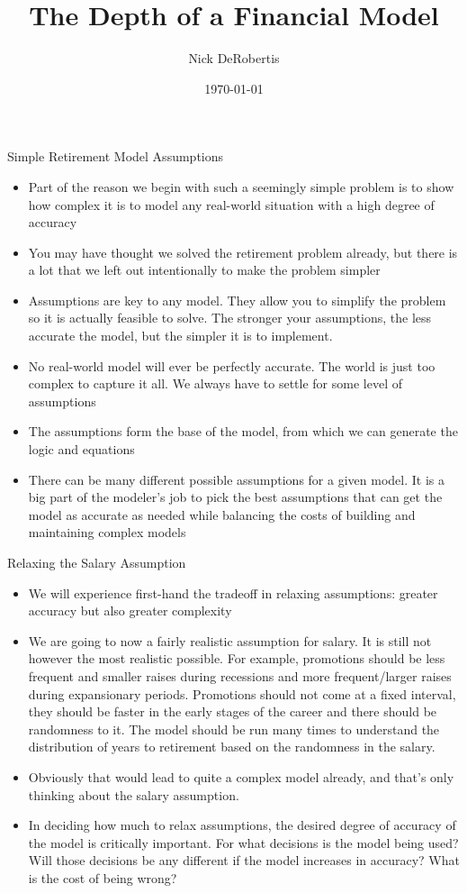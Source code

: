 \documentclass[]{article}
\begin{document}
\title{The Depth of a Financial Model}
\author{Nick DeRobertis}
\date{\today}
\maketitle
\begin{section}{Simple Retirement Model Assumptions}
\begin{itemize}
\item Part of the reason we begin with such a seemingly simple problem is to show how complex it is to model any real-world situation with a high degree of accuracy
\item You may have thought we solved the retirement problem already, but there is a lot that we left out intentionally to make the problem simpler
\item Assumptions are key to any model. They allow you to simplify the problem so it is actually feasible to solve. The stronger your assumptions, the less accurate the model, but the simpler it is to implement.
\item No real-world model will ever be perfectly accurate. The world is just too complex to capture it all. We always have to settle for some level of assumptions
\item The assumptions form the base of the model, from which we can generate the logic and equations
\item There can be many different possible assumptions for a given model. It is a big part of the modeler's job to pick the best assumptions that can get the model as accurate as needed while balancing the costs of building and maintaining complex models
\end{itemize}
\end{section}
\begin{section}{Relaxing the Salary Assumption}
\begin{itemize}
\item We will experience first-hand the tradeoff in relaxing assumptions: greater accuracy but also greater complexity
\item We are going to now a fairly realistic assumption for salary. It is still not however the most realistic possible. For example, promotions should be less frequent and smaller raises during recessions and more frequent/larger raises during expansionary periods. Promotions should not come at a fixed interval, they should be faster in the early stages of the career and there should be randomness to it. The model should be run many times to understand the distribution of years to retirement based on the randomness in the salary.
\item Obviously that would lead to quite a complex model already, and that's only thinking about the salary assumption.
\item In deciding how much to relax assumptions, the desired degree of accuracy of the model is critically important. For what decisions is the model being used? Will those decisions be any different if the model increases in accuracy? What is the cost of being wrong?
\end{itemize}
\end{section}
\end{document}
